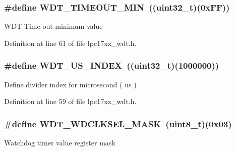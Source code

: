 \hypertarget{group___w_d_t___private___macros_gaef7a6f7ad8a863abf1b818ba2f1317ae}{
\subsubsection[{\-W\-D\-T\-\_\-\-T\-I\-M\-E\-O\-U\-T\-\_\-\-M\-I\-N}]{\setlength{\rightskip}{0pt plus 5cm}\#define {\bf \-W\-D\-T\-\_\-\-T\-I\-M\-E\-O\-U\-T\-\_\-\-M\-I\-N}~((uint32\-\_\-t)(0x\-F\-F))}}\label{group___w_d_t___private___macros_gaef7a6f7ad8a863abf1b818ba2f1317ae}
\-W\-D\-T \-Time out minimum value 

\-Definition at line 61 of file lpc17xx\-\_\-wdt.\-h.

\hypertarget{group___w_d_t___private___macros_ga6e4021c206fe752fabf43f4ec19a0b5c}{
\subsubsection[{\-W\-D\-T\-\_\-\-U\-S\-\_\-\-I\-N\-D\-E\-X}]{\setlength{\rightskip}{0pt plus 5cm}\#define {\bf \-W\-D\-T\-\_\-\-U\-S\-\_\-\-I\-N\-D\-E\-X}~((uint32\-\_\-t)(1000000))}}\label{group___w_d_t___private___macros_ga6e4021c206fe752fabf43f4ec19a0b5c}
\-Define divider index for microsecond ( us ) 

\-Definition at line 59 of file lpc17xx\-\_\-wdt.\-h.

\hypertarget{group___w_d_t___private___macros_ga25bccb79169e6c2dc93d1a2fd4828957}{
\subsubsection[{\-W\-D\-T\-\_\-\-W\-D\-C\-L\-K\-S\-E\-L\-\_\-\-M\-A\-S\-K}]{\setlength{\rightskip}{0pt plus 5cm}\#define {\bf \-W\-D\-T\-\_\-\-W\-D\-C\-L\-K\-S\-E\-L\-\_\-\-M\-A\-S\-K}~(uint8\-\_\-t)(0x03)}}\label{group___w_d_t___private___macros_ga25bccb79169e6c2dc93d1a2fd4828957}
\-Watchdog timer value register mask 

